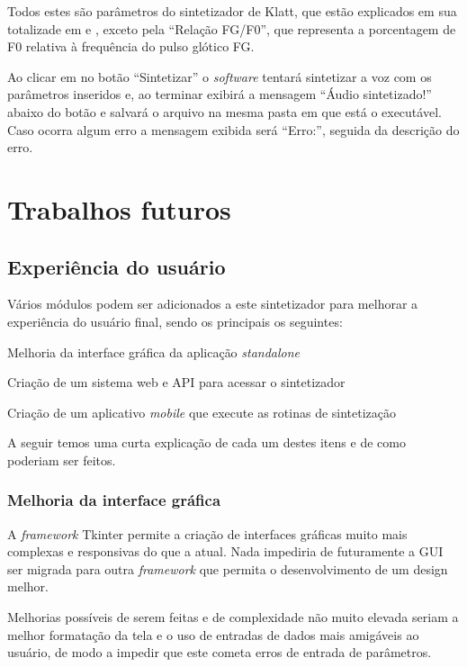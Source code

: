 \documentclass[
  12pt,       
  openright,      
  twoside,      
  a4paper,      
  english,      
  french,       
  spanish,      
  brazil,     
  ]{abntex2}
\begin{document}
Todos estes são parâmetros do sintetizador de Klatt, que estão explicados em sua totalizade em  e , exceto pela ``Relação FG/F0'', que representa a porcentagem de F0 relativa à frequência do pulso glótico FG.

Ao clicar em no botão ``Sintetizar'' o \textit{software} tentará sintetizar a voz com os parâmetros inseridos e, ao terminar exibirá a mensagem ``Áudio sintetizado!'' abaixo do botão e salvará o arquivo na mesma pasta em que está o executável. Caso ocorra algum erro a mensagem exibida será ``Erro:'', seguida da descrição do erro.

\chapter{Trabalhos futuros}
\label{sec:trabalhosfuturos}
\section{Experiência do usuário}
Vários módulos podem ser adicionados a este sintetizador para melhorar a experiência do usuário final, sendo os principais os seguintes:

\begin{alineas}
\item Melhoria da interface gráfica da aplicação \textit{standalone}
\item Criação de um sistema web e API para acessar o sintetizador
\item Criação de um aplicativo \textit{mobile} que execute as rotinas de sintetização
\end{alineas}

A seguir temos uma curta explicação de cada um destes itens e de como poderiam ser feitos.

\subsection{Melhoria da interface gráfica}
A \textit{framework} Tkinter permite a criação de interfaces gráficas muito mais complexas e responsivas do que a atual. Nada impediria de futuramente a GUI ser migrada para outra \textit{framework} que permita o desenvolvimento de um design melhor.

Melhorias possíveis de serem feitas e de complexidade não muito elevada seriam a melhor formatação da tela e o uso de entradas de dados mais amigáveis ao usuário, de modo a impedir que este cometa erros de entrada de parâmetros.
\end{document}
